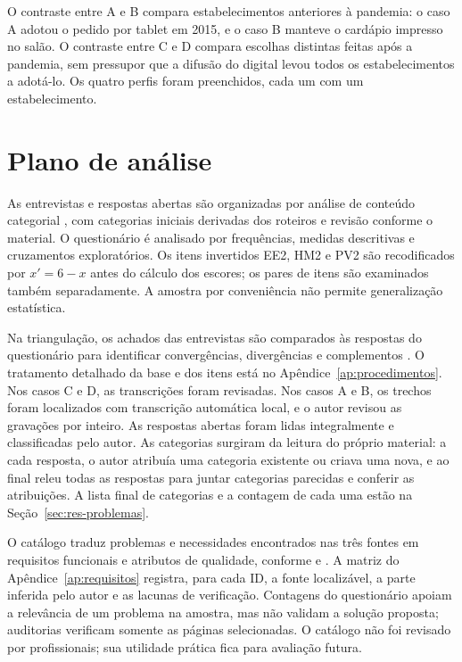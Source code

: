 O contraste entre A e B compara estabelecimentos anteriores à pandemia: o caso A adotou o pedido por tablet em 2015, e o caso B manteve o cardápio impresso no salão. O contraste entre C e D compara escolhas distintas feitas após a pandemia, sem pressupor que a difusão do digital \cite{giovanini2024pandemia} levou todos os estabelecimentos a adotá-lo. Os quatro perfis foram preenchidos, cada um com um estabelecimento.

\section{Plano de análise}
\label{sec:analise}

As entrevistas e respostas abertas são organizadas por análise de conteúdo categorial \cite{bardin2016analise}, com categorias iniciais derivadas dos roteiros e revisão conforme o material. O questionário é analisado por frequências, medidas descritivas e cruzamentos exploratórios. Os itens invertidos EE2, HM2 e PV2 são recodificados por $x'=6-x$ antes do cálculo dos escores; os pares de itens são examinados também separadamente. A amostra por conveniência não permite generalização estatística.

Na triangulação, os achados das entrevistas são comparados às respostas do questionário para identificar convergências, divergências e complementos \cite{venkatesh2013bridging}. O tratamento detalhado da base e dos itens está no Apêndice~\ref{ap:procedimentos}. Nos casos C e D, as transcrições foram revisadas. Nos casos A e B, os trechos foram localizados com transcrição automática local, e o autor revisou as gravações por inteiro. As respostas abertas foram lidas integralmente e classificadas pelo autor. As categorias surgiram da leitura do próprio material: a cada resposta, o autor atribuía uma categoria existente ou criava uma nova, e ao final releu todas as respostas para juntar categorias parecidas e conferir as atribuições. A lista final de categorias e a contagem de cada uma estão na Seção~\ref{sec:res-problemas}.

O catálogo traduz problemas e necessidades encontrados nas três fontes em requisitos funcionais e atributos de qualidade, conforme  e . A matriz do Apêndice~\ref{ap:requisitos} registra, para cada ID, a fonte localizável, a parte inferida pelo autor e as lacunas de verificação. Contagens do questionário apoiam a relevância de um problema na amostra, mas não validam a solução proposta; auditorias verificam somente as páginas selecionadas. O catálogo não foi revisado por profissionais; sua utilidade prática fica para avaliação futura.

